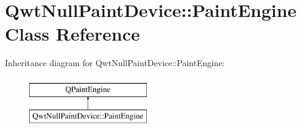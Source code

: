 \hypertarget{class_qwt_null_paint_device_1_1_paint_engine}{\section{Qwt\-Null\-Paint\-Device\-:\-:Paint\-Engine Class Reference}
\label{class_qwt_null_paint_device_1_1_paint_engine}
}
Inheritance diagram for Qwt\-Null\-Paint\-Device\-:\-:Paint\-Engine\-:\begin{figure}[H]
\begin{center}
\leavevmode
\includegraphics[height=2.000000cm]{class_qwt_null_paint_device_1_1_paint_engine}
\end{center}
\end{figure}
